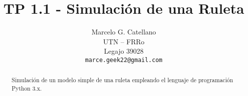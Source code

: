 

\title{TP 1.1 - Simulación de una Ruleta}

\author{
 Marcelo G. Catellano \\
  UTN -- FRRo \\
  Legajo 39028 \\
  \texttt{marce.geek22@gmail.com} \\
}


\maketitle
\begin{abstract}
Simulación de un modelo simple de una ruleta empleando el lenguaje de programación Python 3.x.
\end{abstract}








